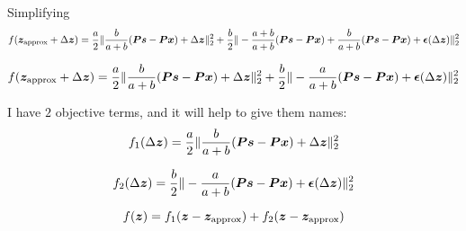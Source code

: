 \documentclass{article}
\begin{document}
Simplifying
\begin{equation}
f(\bm{z}_{\text{approx}} + \Delta\bm{z}) = \frac{a}{2}\|\frac{b}{a + b}(\bm{P}\bm{s} - \bm{P}\bm{x}) + \Delta\bm{z}\|_2^2 + \frac{b}{2}\|-\frac{a + b}{a + b}(\bm{P}\bm{s} - \bm{P}\bm{x}) + \frac{b}{a + b}(\bm{P}\bm{s} - \bm{P}\bm{x}) +\bm{\epsilon}(\Delta\bm{z})\|_2^2
\end{equation}

\begin{equation}
f(\bm{z}_{\text{approx}} + \Delta\bm{z}) = \frac{a}{2}\|\frac{b}{a + b}(\bm{P}\bm{s} - \bm{P}\bm{x}) + \Delta\bm{z}\|_2^2 + \frac{b}{2}\|- \frac{a}{a + b}(\bm{P}\bm{s} - \bm{P}\bm{x}) +\bm{\epsilon}(\Delta\bm{z})\|_2^2
\end{equation}

I have $2$ objective terms, and it will help to give them names:
\begin{equation}
f_1(\Delta\bm{z}) = \frac{a}{2}\|\frac{b}{a + b}(\bm{P}\bm{s} - \bm{P}\bm{x}) + \Delta\bm{z}\|_2^2
\end{equation}

\begin{equation}
f_2(\Delta\bm{z}) = \frac{b}{2}\|- \frac{a}{a + b}(\bm{P}\bm{s} - \bm{P}\bm{x}) +\bm{\epsilon}(\Delta\bm{z})\|_2^2
\end{equation}

\begin{equation}
f(\bm{z}) = f_1(\bm{z} - \bm{z}_{\text{approx}}) + f_2(\bm{z} - \bm{z}_{\text{approx}})
\end{equation}
\end{document}
